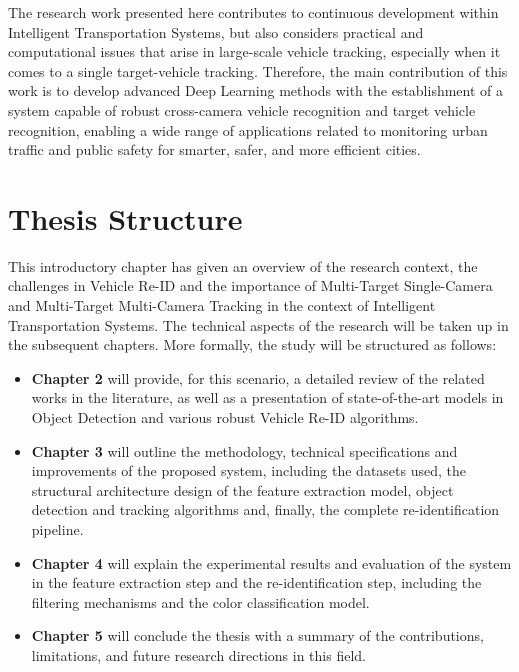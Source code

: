 The research work presented here contributes to continuous development within Intelligent Transportation Systems, but also considers practical and computational issues that arise in large-scale vehicle tracking, especially when it comes to a single target-vehicle tracking. Therefore, the main contribution of this work is to develop advanced Deep Learning methods with the establishment of a system capable of robust cross-camera vehicle recognition and target vehicle recognition, enabling a wide range of applications related to monitoring urban traffic and public safety for smarter, safer, and more efficient cities.

\section{Thesis Structure}
This introductory chapter has given an overview of the research context, the challenges in Vehicle Re-ID and the importance of Multi-Target Single-Camera and Multi-Target Multi-Camera Tracking in the context of Intelligent Transportation Systems. The technical aspects of the research will be taken up in the subsequent chapters. More formally, the study will be structured as follows:
\begin{itemize}
    \item \textbf{Chapter 2} will provide, for this scenario, a detailed review of the related works in the literature, as well as a presentation of state-of-the-art models in Object Detection and various robust Vehicle Re-ID algorithms.
    \item \textbf{Chapter 3} will outline the methodology, technical specifications and improvements of the proposed system, including the datasets used, the structural architecture design of the feature extraction model, object detection and tracking algorithms and, finally, the complete re-identification pipeline.
    \item \textbf{Chapter 4} will explain the experimental results and evaluation of the system in the feature extraction step and the re-identification step, including the filtering mechanisms and the color classification model.
    \item \textbf{Chapter 5} will conclude the thesis with a summary of the contributions, limitations, and future research directions in this field.
\end{itemize}
